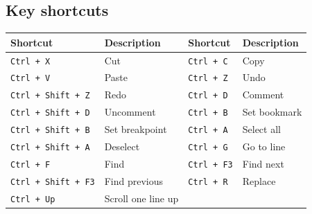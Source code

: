     \subsection{Key shortcuts}
        \begin{table}[h!]
            \centering
            \fontsize{8pt}{9pt}
            {
                \begin{tabular}{|ll|ll|}
                    \hline
                    \textbf{Shortcut}                       & \textbf{Description}          &
                    \textbf{Shortcut}                       & \textbf{Description}          \\\hline
                        \texttt{Ctrl + X}                   & Cut                           &
                        \texttt{Ctrl + C}                   & Copy                          \\
                        \texttt{Ctrl + V}                   & Paste                         &
                        \texttt{Ctrl + Z}                   & Undo                          \\
                        \texttt{Ctrl + Shift + Z}           & Redo                          &
                        \texttt{Ctrl + D}                   & Comment                       \\
                        \texttt{Ctrl + Shift + D}           & Uncomment                     &
                        \texttt{Ctrl + B}                   & Set bookmark                  \\
                        \texttt{Ctrl + Shift + B}           & Set breakpoint                &
                        \texttt{Ctrl + A}                   & Select all                    \\
                        \texttt{Ctrl + Shift + A}           & Deselect                      &
                        \texttt{Ctrl + G}                   & Go to line                    \\
                        \texttt{Ctrl + F}                   & Find                          &
                        \texttt{Ctrl + F3}                  & Find next                     \\
                        \texttt{Ctrl + Shift + F3}          & Find previous                 &
                        \texttt{Ctrl + R}                   & Replace                       \\
                        \texttt{Ctrl + Up}                  & Scroll one line up            &

\end{tabular}}
\end{table}
